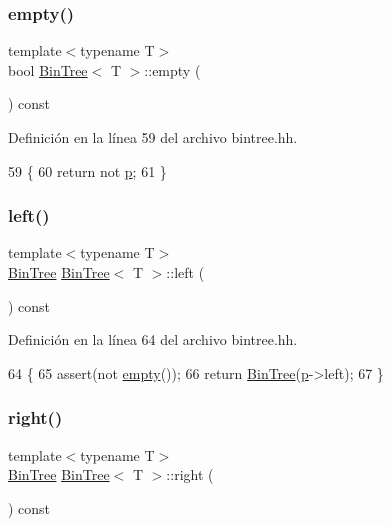 \subsubsection{\texorpdfstring{empty()}{empty()}}
{\footnotesize\ttfamily template$<$typename T$>$ \\
bool \mbox{\hyperlink{class_bin_tree}{Bin\+Tree}}$<$ T $>$\+::empty (\begin{DoxyParamCaption}{ }\end{DoxyParamCaption}) const}



Definición en la línea 59 del archivo bintree.\+hh.


\begin{DoxyCode}
59                         \{
60         \textcolor{keywordflow}{return} not \mbox{\hyperlink{class_bin_tree_afe3647af1dda90f6ddf1deee6560fcf1}{p}};
61     \}
\end{DoxyCode}
\mbox{\label{class_bin_tree_a82108db4c1b08d1f111027788c196d4e}} 
\subsubsection{\texorpdfstring{left()}{left()}}
{\footnotesize\ttfamily template$<$typename T$>$ \\
\mbox{\hyperlink{class_bin_tree}{Bin\+Tree}} \mbox{\hyperlink{class_bin_tree}{Bin\+Tree}}$<$ T $>$\+::left (\begin{DoxyParamCaption}{ }\end{DoxyParamCaption}) const}



Definición en la línea 64 del archivo bintree.\+hh.


\begin{DoxyCode}
64                           \{
65         assert(not \mbox{\hyperlink{class_bin_tree_a74cda259ba5c25b8ee38ed4dc33e4fad}{empty}}());
66         \textcolor{keywordflow}{return} \mbox{\hyperlink{class_bin_tree_a47eef22d29cd023449d97c073c08e5b6}{BinTree}}(\mbox{\hyperlink{class_bin_tree_afe3647af1dda90f6ddf1deee6560fcf1}{p}}->left);
67     \}
\end{DoxyCode}
\mbox{\label{class_bin_tree_aff8e96651b27284c329667b5ad3e4d0b}} 
\subsubsection{\texorpdfstring{right()}{right()}}
{\footnotesize\ttfamily template$<$typename T$>$ \\
\mbox{\hyperlink{class_bin_tree}{Bin\+Tree}} \mbox{\hyperlink{class_bin_tree}{Bin\+Tree}}$<$ T $>$\+::right (\begin{DoxyParamCaption}{ }\end{DoxyParamCaption}) const}



